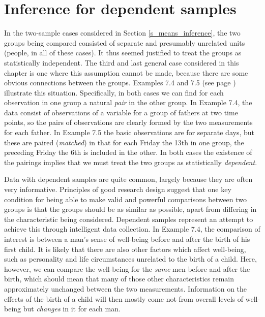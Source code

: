 \section{Inference for dependent samples}
\label{s_means_dependent}

In the two-sample cases considered in Section
\ref{s_means_inference}, the two groups being compared
consisted of separate and presumably unrelated units (people, in all of
these cases). It thus seemed justified to treat the groups as
statistically independent. The third and last general case considered in
this chapter is one where this assumption cannot be made, because there
are some obvious connections between the groups. Examples 7.4 and 7.5
(see page \pageref{p_dependentex}) illustrate this situation.
Specifically, in both cases we can find for each observation in one
group a natural \emph{pair} in the other group. In Example 7.4, the data
consist of observations of a variable for a group of fathers at two time
points, so the pairs of observations are clearly formed by the two
measurements for each father. In Example 7.5 the basic observations are
for separate days, but these are paired (\emph{matched}) in that for
each Friday the 13th in one group, the preceding Friday the 6th is
included in the other. In both cases the existence of the pairings
implies that we must treat the two groups as statistically
\emph{dependent}.

Data with dependent samples are quite common, largely because they are
often very informative. Principles of good research design suggest that
one key condition for being able to make valid
and powerful comparisons between two groups is that
the groups should be as similar as possible, apart from differing in the
characteristic being considered. Dependent samples represent an attempt
to achieve this through intelligent data collection.
In Example 7.4, the comparison of interest
is between a man's sense of well-being before and after the birth of his first
child. It is likely that there are also other factors which affect
well-being, such as personality and life circumstances
unrelated to the birth of a child. Here, however, we can compare the
well-being for the \emph{same} men before and after the birth, which
should mean that many of those other characteristics remain
approximately unchanged between the two measurements. Information on the
effects of the birth of a child will then mostly come not from overall levels
of well-being but \emph{changes} in it for each man.

